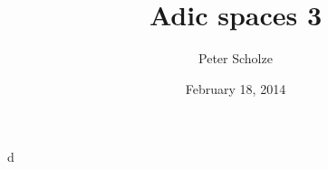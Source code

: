 \documentclass{article}
\title{Adic spaces 3}
\author{Peter Scholze}
\date{February 18, 2014}
\begin{document}
\maketitle





d
\end{document}
